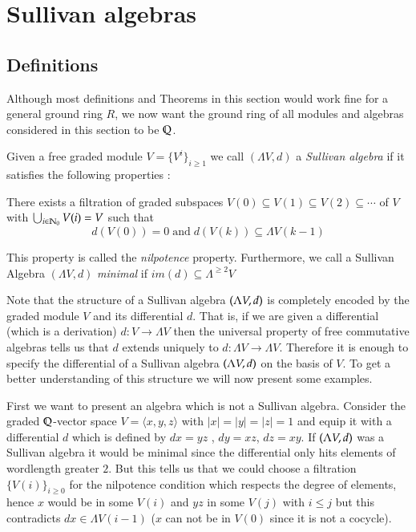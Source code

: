 \section{Sullivan algebras}

\subsection{Definitions}
Although most definitions and Theorems in this section would work fine for a general ground ring $R$, we now want the
ground ring of all modules and algebras considered in this section to be $\mathbb{Q}$.

\begin{Definition}
 Given a free graded module $V = {\lbrace {V^i}\rbrace}_{ i \geq 1} $ we call $(\Lambda V, d)$ a \emph{Sullivan algebra} 
 if it satisfies the following properties :
 
  There exists a filtration of graded subspaces $V(0) \subseteq V(1) \subseteq V(2) \subseteq \cdots $ of $V$
  with $\bigcup_{i \in \mathbb{N}_0} V(i) = V$ such that 
  $$ d(V(0)) = 0 \; \text{and} \; d( V(k)) \subseteq  \Lambda V(k-1) $$
  
 This property is called the \emph{nilpotence} property.
 Furthermore, we call a Sullivan Algebra $(\Lambda V,d)$ \emph{minimal} if $im(d) \subseteq \Lambda^{\geq 2} V$
\end{Definition}

Note that the structure of a Sullivan algebra $(\Lambda V,d)$ is completely encoded by the graded module $V$ and its
differential $d$. That is, if we are given a differential (which is a derivation) $d \colon V \to \Lambda V$ then the
universal property of free commutative algebras tells us that $d$ extends uniquely to $d \colon \Lambda V \to \Lambda V$.
Therefore it is enough to specify the differential of a Sullivan algebra $(\Lambda V,d)$ on the basis of $V$.
To get a better understanding of this structure we will now present some examples.

\begin{Example}
 First we want to present an algebra which is not a Sullivan algebra. 
 Consider the graded $\mathbb{Q}$-vector space $V = \langle x,y,z \rangle$ with $|x| = |y| = |z| = 1$ and 
 equip it with a differential $d$ which is defined by $dx = yz$ , $dy = xz$, $dz = xy$. \newline
 If $(\Lambda V,d)$ was a Sullivan algebra it would be minimal since 
 the differential only hits elements of wordlength greater $2$. But this tells us that we could choose a filtration 
 ${\lbrace V(i) \rbrace}_{i \geq 0}$ for
 the nilpotence condition which respects the degree of elements, hence $ x $ would be in some $V(i)$ and $yz$ in some $V(j)$
 with $i \leq j$ but this contradicts $dx \in \Lambda V(i-1)$ ($x$ can not be in $V(0)$ since it is not a cocycle).
\end{Example}


